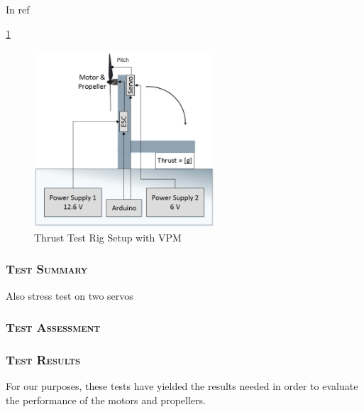 In ref{\ref{fig:VPM} 


\begin{figure}[H]
    \centering
    \includegraphics[width = 0.6\textwidth]{VAPIQ-PICTURES/TestSetup7}
    \caption{Thrust Test Rig Setup with VPM}
    \label{fig:VPM}
\end{figure}


\subsubsection*{\textsc{\medium Test Summary}}
Also stress test on two servos

\subsubsection*{\textsc{\medium Test Assessment}}

\subsubsection*{\textsc{\medium Test Results}}
 For our purposes, these tests have yielded the results needed in order to evaluate the performance of the motors and propellers.
                 
}
